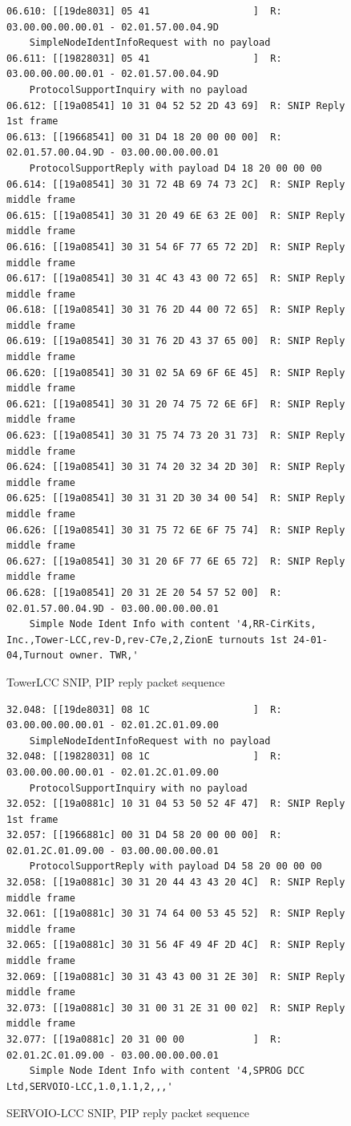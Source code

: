 \documentclass[11pt]{article}
\begin{document}
\begin{figure}[!htbp]
\begin{verbatim}
06.610: [[19de8031] 05 41                  ]  R: 03.00.00.00.00.01 - 02.01.57.00.04.9D 
    SimpleNodeIdentInfoRequest with no payload
06.611: [[19828031] 05 41                  ]  R: 03.00.00.00.00.01 - 02.01.57.00.04.9D 
    ProtocolSupportInquiry with no payload
06.612: [[19a08541] 10 31 04 52 52 2D 43 69]  R: SNIP Reply 1st frame
06.613: [[19668541] 00 31 D4 18 20 00 00 00]  R: 02.01.57.00.04.9D - 03.00.00.00.00.01 
    ProtocolSupportReply with payload D4 18 20 00 00 00
06.614: [[19a08541] 30 31 72 4B 69 74 73 2C]  R: SNIP Reply middle frame
06.615: [[19a08541] 30 31 20 49 6E 63 2E 00]  R: SNIP Reply middle frame
06.616: [[19a08541] 30 31 54 6F 77 65 72 2D]  R: SNIP Reply middle frame
06.617: [[19a08541] 30 31 4C 43 43 00 72 65]  R: SNIP Reply middle frame
06.618: [[19a08541] 30 31 76 2D 44 00 72 65]  R: SNIP Reply middle frame
06.619: [[19a08541] 30 31 76 2D 43 37 65 00]  R: SNIP Reply middle frame
06.620: [[19a08541] 30 31 02 5A 69 6F 6E 45]  R: SNIP Reply middle frame
06.621: [[19a08541] 30 31 20 74 75 72 6E 6F]  R: SNIP Reply middle frame
06.623: [[19a08541] 30 31 75 74 73 20 31 73]  R: SNIP Reply middle frame
06.624: [[19a08541] 30 31 74 20 32 34 2D 30]  R: SNIP Reply middle frame
06.625: [[19a08541] 30 31 31 2D 30 34 00 54]  R: SNIP Reply middle frame
06.626: [[19a08541] 30 31 75 72 6E 6F 75 74]  R: SNIP Reply middle frame
06.627: [[19a08541] 30 31 20 6F 77 6E 65 72]  R: SNIP Reply middle frame
06.628: [[19a08541] 20 31 2E 20 54 57 52 00]  R: 02.01.57.00.04.9D - 03.00.00.00.00.01 
    Simple Node Ident Info with content '4,RR-CirKits, Inc.,Tower-LCC,rev-D,rev-C7e,2,ZionE turnouts 1st 24-01-04,Turnout owner. TWR,'
\end{verbatim}
\caption{TowerLCC SNIP, PIP reply packet sequence}
\label{fig:TWR_SNIP_PIP_reply_sequence}
\end{figure}

\begin{figure}[!htbp]
\begin{verbatim}
32.048: [[19de8031] 08 1C                  ]  R: 03.00.00.00.00.01 - 02.01.2C.01.09.00 
    SimpleNodeIdentInfoRequest with no payload
32.048: [[19828031] 08 1C                  ]  R: 03.00.00.00.00.01 - 02.01.2C.01.09.00 
    ProtocolSupportInquiry with no payload
32.052: [[19a0881c] 10 31 04 53 50 52 4F 47]  R: SNIP Reply 1st frame
32.057: [[1966881c] 00 31 D4 58 20 00 00 00]  R: 02.01.2C.01.09.00 - 03.00.00.00.00.01 
    ProtocolSupportReply with payload D4 58 20 00 00 00
32.058: [[19a0881c] 30 31 20 44 43 43 20 4C]  R: SNIP Reply middle frame
32.061: [[19a0881c] 30 31 74 64 00 53 45 52]  R: SNIP Reply middle frame
32.065: [[19a0881c] 30 31 56 4F 49 4F 2D 4C]  R: SNIP Reply middle frame
32.069: [[19a0881c] 30 31 43 43 00 31 2E 30]  R: SNIP Reply middle frame
32.073: [[19a0881c] 30 31 00 31 2E 31 00 02]  R: SNIP Reply middle frame
32.077: [[19a0881c] 20 31 00 00            ]  R: 02.01.2C.01.09.00 - 03.00.00.00.00.01 
    Simple Node Ident Info with content '4,SPROG DCC Ltd,SERVOIO-LCC,1.0,1.1,2,,,'
\end{verbatim}
\caption{SERVOIO-LCC SNIP, PIP reply packet sequence}
\label{fig:SERVOIO_SNIP_PIP_reply_sequence}
\end{figure}
\end{document}
